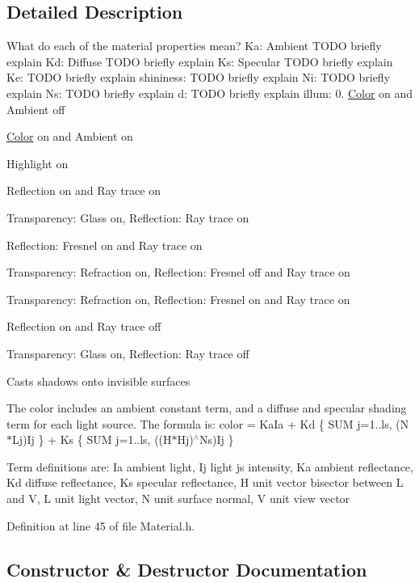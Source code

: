 \subsection{Detailed Description}
What do each of the material properties mean? Ka\+: Ambient T\+O\+DO briefly explain Kd\+: Diffuse T\+O\+DO briefly explain Ks\+: Specular T\+O\+DO briefly explain Ke\+: T\+O\+DO briefly explain shininess\+: T\+O\+DO briefly explain Ni\+: T\+O\+DO briefly explain Ns\+: T\+O\+DO briefly explain d\+: T\+O\+DO briefly explain illum\+: 0. \hyperlink{struct_color}{Color} on and Ambient off
\begin{DoxyEnumerate}
\item \hyperlink{struct_color}{Color} on and Ambient on
\item Highlight on
\item Reflection on and Ray trace on
\item Transparency\+: Glass on, Reflection\+: Ray trace on
\item Reflection\+: Fresnel on and Ray trace on
\item Transparency\+: Refraction on, Reflection\+: Fresnel off and Ray trace on
\item Transparency\+: Refraction on, Reflection\+: Fresnel on and Ray trace on
\item Reflection on and Ray trace off
\item Transparency\+: Glass on, Reflection\+: Ray trace off
\item Casts shadows onto invisible surfaces
\end{DoxyEnumerate}

The color includes an ambient constant term, and a diffuse and specular shading term for each light source. The formula is\+: color = Ka\+Ia + Kd \{ S\+UM j=1..ls, (N$\ast$\+Lj)Ij \} + Ks \{ S\+UM j=1..ls, ((H$\ast$\+Hj)$^\wedge$\+Ns)Ij \}

Term definitions are\+: Ia ambient light, Ij light j\textquotesingle{}s intensity, Ka ambient reflectance, Kd diffuse reflectance, Ks specular reflectance, H unit vector bisector between L and V, L unit light vector, N unit surface normal, V unit view vector 

Definition at line 45 of file Material.\+h.



\subsection{Constructor \& Destructor Documentation}
\mbox{\label{class_material_a137e987401b63eb7c6c27c3e38bc74b5}} 
